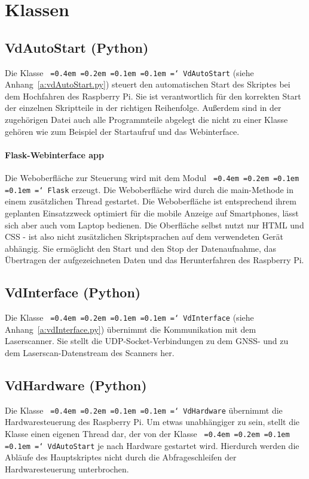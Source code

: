 \documentclass[a4paper,12pt,bibliography=totoc, listof=totoc,titlepage,pointlessnumbers]{scrreprt}
\newcommand*\justify{%
  \fontdimen2\font=0.4em%
  \fontdimen3\font=0.2em%
  \fontdimen4\font=0.1em%
  \fontdimen7\font=0.1em%
  \hyphenchar\font=`\-%
}
\newcommand{\code}[1]{\texttt{\justify{#1}}}
\begin{document}
\section{Klassen}
\label{s:klassen}

\subsection{VdAutoStart (Python)}
Die Klasse \code{VdAutoStart} (siehe Anhang~\ref{a:vdAutoStart.py}) steuert den automatischen Start des Skriptes bei dem Hochfahren des Rasp\-berry Pi. Sie ist verantwortlich für den korrekten Start der einzelnen Skriptteile in der richtigen Reihenfolge. Außerdem sind in der zugehörigen Datei auch alle Programmteile abgelegt die nicht zu einer Klasse gehören wie zum Beispiel der Startaufruf und das Webinterface.

\paragraph{Flask-Webinterface app}
Die Weboberfläche zur Steuerung wird mit dem Modul \code{Flask} erzeugt. Die Weboberfläche wird durch die main-Methode in einem zusätzlichen Thread gestartet. Die Weboberfläche ist entsprechend ihrem geplanten Einsatzzweck optimiert für die mobile Anzeige auf Smartphones, lässt sich aber auch vom Laptop bedienen. Die Oberfläche selbst nutzt nur HTML und CSS - ist also nicht zusätzlichen Skriptsprachen auf dem verwendeten Gerät abhängig. 
Sie ermöglicht den Start und den Stop der Datenaufnahme, das Übertragen der aufgezeichneten Daten und das Herunterfahren des Raspberry Pi.

\subsection{VdInterface (Python)}
Die Klasse \code{VdInterface} (siehe Anhang~\ref{a:vdInterface.py}) übernimmt die Kommunikation mit dem Laser\-scan\-ner. Sie stellt die UDP-Socket-Verbindungen zu dem GNSS- und zu dem Laserscan-Datenstream des Scanners her.


\subsection{VdHardware (Python)}
Die Klasse \code{VdHardware} übernimmt die Hardwaresteuerung des Rasp\-berry Pi. Um etwas unabhängiger zu sein, stellt die Klasse einen eigenen Thread dar, der von der Klasse \code{VdAutoStart} je nach Hardware gestartet wird. Hierdurch werden die Abläufe des Hauptskriptes nicht durch die Abfrageschleifen der Hardwaresteuerung unterbrochen.
\end{document}
